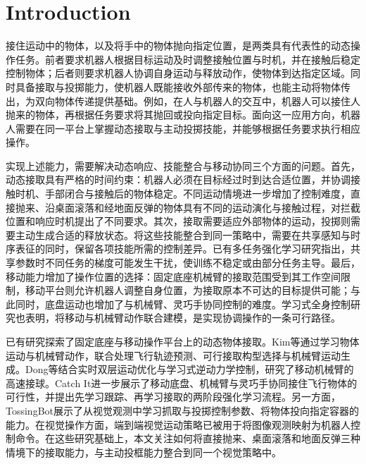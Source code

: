 \section{Introduction}
\label{sec:introduction}

接住运动中的物体，以及将手中的物体抛向指定位置，是两类具有代表性的动态操作任务。前者要求机器人根据目标运动及时调整接触位置与时机，并在接触后稳定控制物体；后者则要求机器人协调自身运动与释放动作，使物体到达指定区域\cite{kim2014catching,zeng2019tossingbot,zhang2024catchit}。同时具备接取与投掷能力，使机器人既能接收外部传来的物体，也能主动将物体传出，为双向物体传递提供基础。例如，在人与机器人的交互中，机器人可以接住人抛来的物体，再根据任务要求将其抛回或投向指定目标。面向这一应用方向，机器人需要在同一平台上掌握动态接取与主动投掷技能，并能够根据任务要求执行相应操作。

实现上述能力，需要解决动态响应、技能整合与移动协同三个方面的问题。首先，动态接取具有严格的时间约束：机器人必须在目标经过时到达合适位置，并协调接触时机、手部闭合与接触后的物体稳定\cite{kim2014catching,zhang2024catchit}。不同运动情境进一步增加了控制难度，直接抛来、沿桌面滚落和经地面反弹的物体具有不同的运动演化与接触过程，对拦截位置和响应时机提出了不同要求。其次，接取需要适应外部物体的运动，投掷则需要主动生成合适的释放状态\cite{kim2014catching,zeng2019tossingbot}。将这些技能整合到同一策略中，需要在共享感知与时序表征的同时，保留各项技能所需的控制差异。已有多任务强化学习研究指出，共享参数时不同任务的梯度可能发生干扰，使训练不稳定或由部分任务主导\cite{teh2017distral}。最后，移动能力增加了操作位置的选择：固定底座机械臂的接取范围受到其工作空间限制，移动平台则允许机器人调整自身位置，为接取原本不可达的目标提供可能；与此同时，底盘运动也增加了与机械臂、灵巧手协同控制的难度\cite{zhang2024catchit,dong2020catchball}。学习式全身控制研究也表明，将移动与机械臂动作联合建模，是实现协调操作的一条可行路径\cite{fu2022wholebody}。

已有研究探索了固定底座与移动操作平台上的动态物体接取。Kim等通过学习物体运动与机械臂动作，联合处理飞行轨迹预测、可行接取构型选择与机械臂运动生成\cite{kim2014catching}。Dong等结合实时双层运动优化与学习式逆动力学控制，研究了移动机械臂的高速接球\cite{dong2020catchball}。Catch It进一步展示了移动底盘、机械臂与灵巧手协同接住飞行物体的可行性，并提出先学习跟踪、再学习接取的两阶段强化学习流程\cite{zhang2024catchit}。另一方面，TossingBot展示了从视觉观测中学习抓取与投掷控制参数、将物体投向指定容器的能力\cite{zeng2019tossingbot}。在视觉操作方面，端到端视觉运动策略已被用于将图像观测映射为机器人控制命令\cite{levine2016visuomotor}。在这些研究基础上，本文关注如何将直接抛来、桌面滚落和地面反弹三种情境下的接取能力，与主动投框能力整合到同一个视觉策略中。

